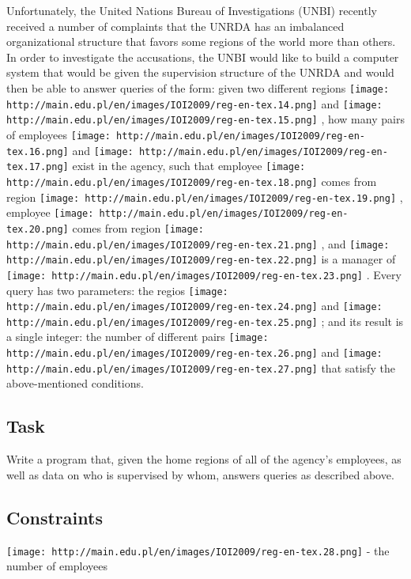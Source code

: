    Unfortunately, the United Nations Bureau of Investigations (UNBI)  recently received a number of complaints that the UNRDA has an  imbalanced organizational structure that favors some regions of the  world more than others. In order to investigate the accusations, the  UNBI would like to build a computer system that would be given the  supervision structure of the UNRDA and would then be able to answer  queries of the form: given two different regions   
\texttt{[image: http://main.edu.pl/en/images/IOI2009/reg-en-tex.14.png]}   and   
\texttt{[image: http://main.edu.pl/en/images/IOI2009/reg-en-tex.15.png]}   , how many pairs of employees   
\texttt{[image: http://main.edu.pl/en/images/IOI2009/reg-en-tex.16.png]}   and   
\texttt{[image: http://main.edu.pl/en/images/IOI2009/reg-en-tex.17.png]}   exist in the agency, such that employee   
\texttt{[image: http://main.edu.pl/en/images/IOI2009/reg-en-tex.18.png]}   comes from region   
\texttt{[image: http://main.edu.pl/en/images/IOI2009/reg-en-tex.19.png]}   , employee   
\texttt{[image: http://main.edu.pl/en/images/IOI2009/reg-en-tex.20.png]}   comes from region   
\texttt{[image: http://main.edu.pl/en/images/IOI2009/reg-en-tex.21.png]}   , and   
\texttt{[image: http://main.edu.pl/en/images/IOI2009/reg-en-tex.22.png]}   is a manager of   
\texttt{[image: http://main.edu.pl/en/images/IOI2009/reg-en-tex.23.png]}   . Every query has two parameters: the regios   
\texttt{[image: http://main.edu.pl/en/images/IOI2009/reg-en-tex.24.png]}   and   
\texttt{[image: http://main.edu.pl/en/images/IOI2009/reg-en-tex.25.png]}   ; and its result is a single integer: the number of different pairs   
\texttt{[image: http://main.edu.pl/en/images/IOI2009/reg-en-tex.26.png]}   and   
\texttt{[image: http://main.edu.pl/en/images/IOI2009/reg-en-tex.27.png]}   that satisfy the above-mentioned conditions.  

\subsection{   Task  }

   Write a program that, given the home regions of all of the agency's  employees, as well as data on who is supervised by whom, answers queries  as described above.  

\subsection{   Constraints  }


\texttt{[image: http://main.edu.pl/en/images/IOI2009/reg-en-tex.28.png]}   - the number of employees   



